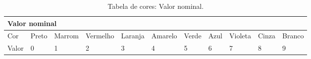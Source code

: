 \begin{table}[H]
\small
\caption{Tabela de cores: Valor nominal.}
\label{tab03}
\begin{tabularx}{\textwidth}{lllllllllll}
\toprule 
\multicolumn{11}{l}{Valor nominal} \\
\midrule
Cor & Preto & Marrom & Vermelho & Laranja & Amarelo & Verde & Azul & Violeta & Cinza & Branco \\
\midrule
Valor & 0 & 1 & 2 & 3 & 4 & 5 & 6 & 7 & 8 & 9 \\
\bottomrule
\end{tabularx}
\end{table}


